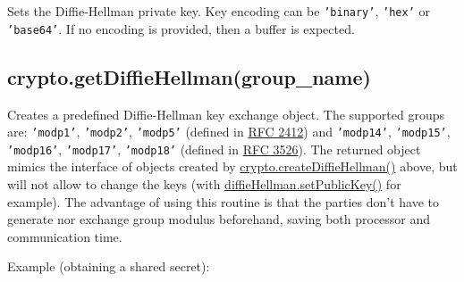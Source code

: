 Sets the Diffie-Hellman private key. Key encoding can be
\texttt{'binary'}, \texttt{'hex'} or \texttt{'base64'}. If no encoding
is provided, then a buffer is expected.

\subsection{crypto.getDiffieHellman(group\_name)}

Creates a predefined Diffie-Hellman key exchange object. The supported
groups are: \texttt{'modp1'}, \texttt{'modp2'}, \texttt{'modp5'}
(defined in \href{http://www.rfc-editor.org/rfc/rfc2412.txt}{RFC 2412})
and \texttt{'modp14'}, \texttt{'modp15'}, \texttt{'modp16'},
\texttt{'modp17'}, \texttt{'modp18'} (defined in
\href{http://www.rfc-editor.org/rfc/rfc3526.txt}{RFC 3526}). The
returned object mimics the interface of objects created by
\hyperref[crypto_crypto_creatediffiehellman_prime_encoding]{crypto.createDiffieHellman()}
above, but will not allow to change the keys (with
\hyperref[crypto_diffiehellman_setpublickey_public_key_encoding]{diffieHellman.setPublicKey()}
for example). The advantage of using this routine is that the parties
don't have to generate nor exchange group modulus beforehand, saving
both processor and communication time.

Example (obtaining a shared secret):

\begin{Shaded}
\begin{Highlighting}[]
 \NormalTok{);}
 \NormalTok{(}\NormalTok{);}
 \NormalTok{(}\NormalTok{);}

\NormalTok{();}
\NormalTok{();}

 \NormalTok{(}\NormalTok{);}
 \NormalTok{(}\NormalTok{);}

\end{Highlighting}
\end{Shaded}

